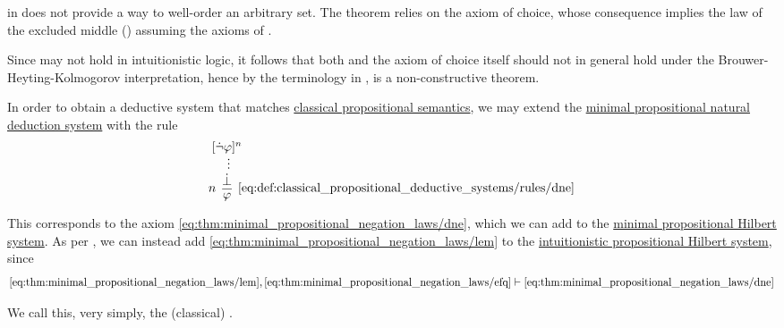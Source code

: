 \begin{example}\label{ex:con:brouwer_heyting_kolmogorov_interpretation/well_ordering_principle_zfc}
   in \hyperref[def:set]{} does not provide a way to well-order an arbitrary set. The theorem relies on the axiom of choice, whose consequence  implies the law of the excluded middle () assuming the axioms of .

  Since  may not hold in intuitionistic logic, it follows that both  and the axiom of choice itself should not in general hold under the Brouwer-Heyting-Kolmogorov interpretation, hence by the terminology in ,  is a non-constructive theorem.
\end{example}

\begin{definition}\label{def:classical_propositional_deductive_systems}
  In order to obtain a deductive system that matches \hyperref[def:propositional_entailment]{classical propositional semantics}, we may extend the \hyperref[def:minimal_propositional_natural_deduction_system]{minimal propositional natural deduction system} with the rule
  \begin{equation*}\taglabel[\logic{DNE}]{eq:def:classical_propositional_deductive_systems/rules/dne}
    \begin{prooftree}
      \hypo{ [\synneg \varphi]^n }
      \ellipsis {} { \synbot }
      \infer[left label=\( n \)]1[\ref{eq:def:classical_propositional_deductive_systems/rules/dne}]{ \varphi }
    \end{prooftree}
  \end{equation*}

  This corresponds to the axiom \eqref{eq:thm:minimal_propositional_negation_laws/dne}, which we can add to the \hyperref[def:minimal_propositional_hilbert_system]{minimal propositional Hilbert system}. As per , we can instead add \eqref{eq:thm:minimal_propositional_negation_laws/lem} to the \hyperref[def:intuitionistic_propositional_deductive_systems]{intuitionistic propositional Hilbert system}, since
  \begin{equation*}
    \eqref{eq:thm:minimal_propositional_negation_laws/lem}, \eqref{eq:thm:minimal_propositional_negation_laws/efq} \vdash \eqref{eq:thm:minimal_propositional_negation_laws/dne}
  \end{equation*}

  We call this, very simply, the (classical) .
\end{definition}

